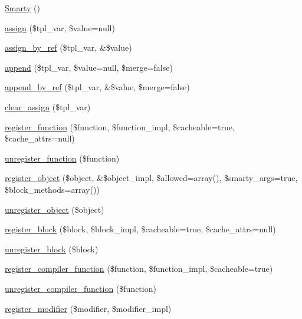 \begin{DoxyCompactItemize}
\item 
\hyperlink{class_smarty_a95e66b59b996781de0a0b95c83f1a5a7}{\-Smarty} ()
\item 
\hyperlink{class_smarty_a12150893d5c5bab121e248f450e727fa}{assign} (\$tpl\-\_\-var, \$value=null)
\item 
\hyperlink{class_smarty_aebc96e36370712d0c9e5896db76bd487}{assign\-\_\-by\-\_\-ref} (\$tpl\-\_\-var, \&\$value)
\item 
\hyperlink{class_smarty_a9870a97b08f66d2c1b19f3e54770cb29}{append} (\$tpl\-\_\-var, \$value=null, \$merge=false)
\item 
\hyperlink{class_smarty_a1a744cb1e3d6473ddcd531412c54f07e}{append\-\_\-by\-\_\-ref} (\$tpl\-\_\-var, \&\$value, \$merge=false)
\item 
\hyperlink{class_smarty_ad0188dcb261ac235ac70c141f2e6657e}{clear\-\_\-assign} (\$tpl\-\_\-var)
\item 
\hyperlink{class_smarty_aa933e1e9fb0b13f22101de4acbaf699c}{register\-\_\-function} (\$function, \$function\-\_\-impl, \$cacheable=true, \$cache\-\_\-attrs=null)
\item 
\hyperlink{class_smarty_ae73d72302d6bcf8a0b284654b2ecef15}{unregister\-\_\-function} (\$function)
\item 
\hyperlink{class_smarty_ad3e5b167a6483dbd669a736ee0000b9a}{register\-\_\-object} (\$object, \&\$object\-\_\-impl, \$allowed=array(), \$smarty\-\_\-args=true, \$block\-\_\-methods=array())
\item 
\hyperlink{class_smarty_a49288d1943e174bcb8e924a4b449d050}{unregister\-\_\-object} (\$object)
\item 
\hyperlink{class_smarty_a2a6564c20eaeecdddd192885f9d5a794}{register\-\_\-block} (\$block, \$block\-\_\-impl, \$cacheable=true, \$cache\-\_\-attrs=null)
\item 
\hyperlink{class_smarty_aa27d55eff4bc63b71da604fb1af362c9}{unregister\-\_\-block} (\$block)
\item 
\hyperlink{class_smarty_a4b141e0b9a699098e8986aca16e871ca}{register\-\_\-compiler\-\_\-function} (\$function, \$function\-\_\-impl, \$cacheable=true)
\item 
\hyperlink{class_smarty_a85920043d6bf2ee895a1dc3fa2c464ca}{unregister\-\_\-compiler\-\_\-function} (\$function)
\item 
\hyperlink{class_smarty_ac1483efc4d74e159c9ddb29b33fbfcc0}{register\-\_\-modifier} (\$modifier, \$modifier\-\_\-impl)
\item 

\end{DoxyCompactItemize}
